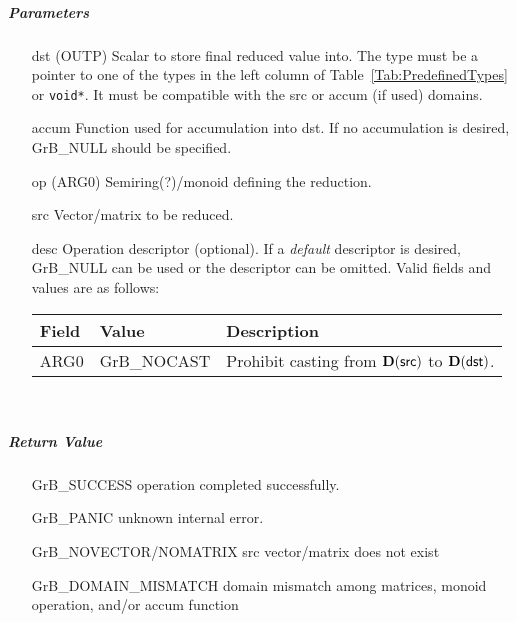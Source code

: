 \subparagraph{Parameters}

\begin{itemize}[leftmargin=1.1in]
    \item[{\sf dst}]    ({\sf OUTP}) Scalar to store final reduced value into.  The type must be
                        a pointer to one of the types in the left column of 
                        Table~\ref{Tab:PredefinedTypes} or {\tt void*}. It must be
                        compatible with the {\sf src} or {\sf accum} (if used) domains.

    \item[{\sf accum}]  Function used for accumulation into {\sf dst}.  If no accumulation
                        is desired, {\sf GrB\_NULL} should be specified.

    \item[{\sf op}]     ({\sf ARG0}) Semiring(?)/monoid defining the reduction.
    \item[{\sf src}]    Vector/matrix to be reduced.

    \item[{\sf desc}]   Operation descriptor (optional). If a
    \emph{default} descriptor is desired, {\sf GrB\_NULL} can be
    used or the descriptor can be omitted.  Valid fields and values are as follows: \\
    \begin{tabular}{lll}
    Field  & Value & Description \\
    \hline
    {\sf ARG0} & {\sf GrB\_NOCAST} & Prohibit casting from $\bold{D}({\sf src})$ to 
    $\bold{D}({\sf dst})$.  \\
    \end{tabular}\\
\end{itemize}

\subparagraph{Return Value}

\begin{itemize}[leftmargin=2.1in]
\item[{\sf GrB\_SUCCESS}]             operation completed successfully.
\item[{\sf GrB\_PANIC}]               unknown internal error.
\item[{\sf GrB\_NOVECTOR/NOMATRIX}]   {\sf src} vector/matrix does not exist
\item[{\sf GrB\_DOMAIN\_MISMATCH}]  
        domain mismatch among matrices, monoid operation, and/or
        accum function 
\end{itemize}

